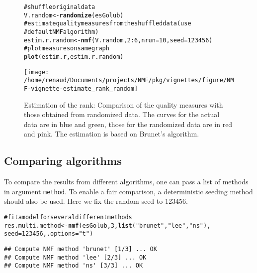 \documentclass[a4paper]{article}\usepackage{graphicx, color}
\makeatletter
\def\maxwidth{ %
  \ifdim\Gin@nat@width>\linewidth
    \linewidth
  \else
    \Gin@nat@width
  \fi
}
\newcommand{\hlfunctioncall}[1]{\textcolor[rgb]{0.501960784313725,0,0.329411764705882}{\textbf{#1}}}%
\newcommand{\hlstring}[1]{\textcolor[rgb]{0.6,0.6,1}{#1}}%
\newcommand{\hlcomment}[1]{\textcolor[rgb]{0.180392156862745,0.6,0.341176470588235}{#1}}%
\newenvironment{kframe}{%
 \def\at@end@of@kframe{}%
 \ifinner\ifhmode%
  \def\at@end@of@kframe{\end{minipage}}%
  \begin{minipage}{\columnwidth}%
 \fi\fi%
 \def\FrameCommand##1{\hskip\@totalleftmargin \hskip-\fboxsep
 \colorbox{shadecolor}{##1}\hskip-\fboxsep
     \hskip-\linewidth \hskip-\@totalleftmargin \hskip\columnwidth}%
 \MakeFramed {\advance\hsize-\width
   \@totalleftmargin\z@ \linewidth\hsize
   \@setminipage}}%
 {\par\unskip\endMakeFramed%
 \at@end@of@kframe}
\newenvironment{knitrout}{}{} %
\let\code=\texttt
\makeatother
\begin{document}
\begin{figure}
\begin{knitrout}
\color{fgcolor}\begin{kframe}
\begin{alltt}
\hlcomment{# shuffle original data}
V.random <- \hlfunctioncall{randomize}(esGolub)
\hlcomment{# estimate quality measures from the shuffled data (use}
\hlcomment{# default NMF algorithm)}
estim.r.random <- \hlfunctioncall{nmf}(V.random, 2:6, nrun = 10, seed = 123456)
\hlcomment{# plot measures on same graph}
\hlfunctioncall{plot}(estim.r, estim.r.random)
\end{alltt}
\end{kframe}
\texttt{[image: /home/renaud/Documents/projects/NMF/pkg/vignettes/figure/NMF-vignette-estimate\_rank\_random]} 

\end{knitrout}

\caption{Estimation of the rank: Comparison of the quality measures with those obtained from randomized data. 
The curves for the actual data are in blue and green, those for the randomized data are in red and pink. 
The estimation is based on Brunet's algorithm.}
\label{fig:estim_all_rd}
\end{figure}

\subsection{Comparing algorithms}
To compare the results from different algorithms, one can pass a list of methods in argument \code{method}. 
To enable a fair comparison, a deterministic seeding method should also be used. 
Here we fix the random seed to 123456. 

\begin{knitrout}
\color{fgcolor}\begin{kframe}
\begin{alltt}
\hlcomment{# fit a model for several different methods}
res.multi.method <- \hlfunctioncall{nmf}(esGolub, 3, \hlfunctioncall{list}(\hlstring{"brunet"}, \hlstring{"lee"}, \hlstring{"ns"}), 
    seed = 123456, .options = \hlstring{"t"})
\end{alltt}
\begin{verbatim}
## Compute NMF method 'brunet' [1/3] ... OK
## Compute NMF method 'lee' [2/3] ... OK
## Compute NMF method 'ns' [3/3] ... OK
\end{verbatim}
\end{kframe}
\end{knitrout}
\end{document}
